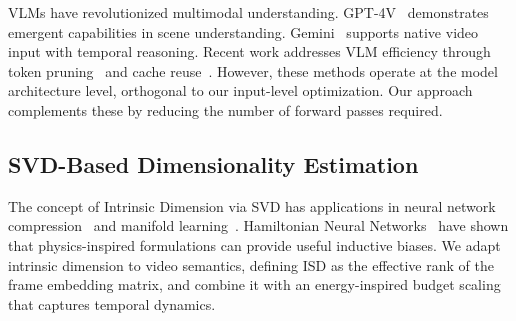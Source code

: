VLMs have revolutionized multimodal understanding. GPT-4V~\cite{openai2023gpt4v} demonstrates emergent capabilities in scene understanding. Gemini~\cite{team2023gemini} supports native video input with temporal reasoning. Recent work addresses VLM efficiency through token pruning~\cite{chen2024tokenpacker} and cache reuse~\cite{kwon2023efficient}. However, these methods operate at the model architecture level, orthogonal to our input-level optimization. Our approach complements these by reducing the number of forward passes required.

\subsection{SVD-Based Dimensionality Estimation}

The concept of Intrinsic Dimension via SVD has applications in neural network compression~\cite{denton2014exploiting} and manifold learning~\cite{fefferman2016testing}. Hamiltonian Neural Networks~\cite{greydanus2019hamiltonian} have shown that physics-inspired formulations can provide useful inductive biases. We adapt intrinsic dimension to video semantics, defining ISD as the effective rank of the frame embedding matrix, and combine it with an energy-inspired budget scaling that captures temporal dynamics.